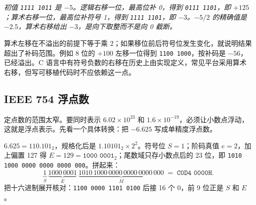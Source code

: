 \begin{center}
\par\vspace{2pt}
{\footnotesize\itshape 初值 \texttt{1111 1011} 是 $-5$。逻辑右移一位，最高位补 0，得到 \texttt{0111 1101}，即 $+125$；算术右移一位，最高位补符号 1，得到 \texttt{1111 1101}，即 $-3$。$-5/2$ 的精确值是 $-2.5$，算术右移给出 $-3$，是向下取整而不是向 0 截断。}
\end{center}

算术左移在不溢出的前提下等于乘 2；如果移位前后符号位发生变化，就说明结果超出了补码范围。例如 8 位的 $+100$ 左移一位得到 \texttt{1100 1000}，按补码是 $-56$，已经溢出。C 语言中有符号负数的右移在历史上由实现定义，常见平台采用算术右移，但写可移植代码时不应依赖这一点。

\subsection{IEEE 754 浮点数}

定点数的范围太窄。要同时表示 $6.02\times10^{23}$ 和 $1.6\times10^{-19}$，必须让小数点浮动，这就是浮点表示。先看一个具体转换：把 $-6.625$ 写成单精度浮点数。

$6.625=110.101_2$，规格化后是 $1.10101_2\times2^2$。符号位 $S=1$；阶码真值 $e=2$，加上偏置 127 得 $E=129=\texttt{1000 0001}_2$；尾数域只存小数点后的 23 位，即 \texttt{1010 1000 0000 0000 0000 000}。拼起来：
\[
\underbrace{1}_{S}\ \underbrace{1000\,0001}_{E}\ \underbrace{1010\,1000\,0000\,0000\,0000\,000}_{M}
\;=\;\texttt{C0D4 0000H}.
\]
把十六进制展开核对：\texttt{1100 0000 1101 0100} 后接 16 个 0，前 9 位正是 $S$ 和 $E$。

